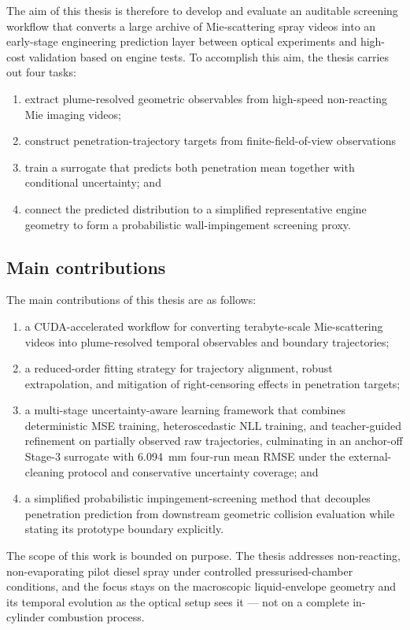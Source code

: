 The aim of this thesis is therefore to develop and evaluate an auditable screening workflow
that converts a large archive of Mie-scattering spray videos into an early-stage engineering prediction layer
between optical experiments and high-cost validation based on engine tests.
To accomplish this aim, the thesis carries out four tasks:
\begin{enumerate}
  \item extract plume-resolved geometric observables from high-speed non-reacting Mie imaging videos;
  \item construct penetration-trajectory targets from finite-field-of-view observations
  \item train a surrogate that predicts both penetration mean together with conditional uncertainty; and
  \item connect the predicted distribution to a simplified representative engine geometry to form a probabilistic wall-impingement screening proxy.
\end{enumerate}

\subsection{Main contributions}

The main contributions of this thesis are as follows:
\begin{enumerate}
  \item a CUDA-accelerated workflow for converting terabyte-scale Mie-scattering videos into plume-resolved temporal observables and boundary trajectories;
  \item a reduced-order fitting strategy for trajectory alignment, robust extrapolation, and mitigation of right-censoring effects in penetration targets;
  \item a multi-stage uncertainty-aware learning framework that combines deterministic MSE training, heteroscedastic NLL training, and teacher-guided refinement on partially observed raw trajectories, culminating in an anchor-off Stage-3 surrogate with \SI{6.094}{mm} four-run mean RMSE under the external-cleaning protocol and conservative uncertainty coverage; and
  \item a simplified probabilistic impingement-screening method that decouples penetration prediction from downstream geometric collision evaluation while stating its prototype boundary explicitly.
\end{enumerate}

The scope of this work is bounded on purpose.
The thesis addresses non-reacting, non-evaporating pilot diesel spray under controlled pressurised-chamber conditions,
and the focus stays on the macroscopic liquid-envelope geometry and its temporal evolution as the optical setup sees it
--- not on a complete in-cylinder combustion process.

